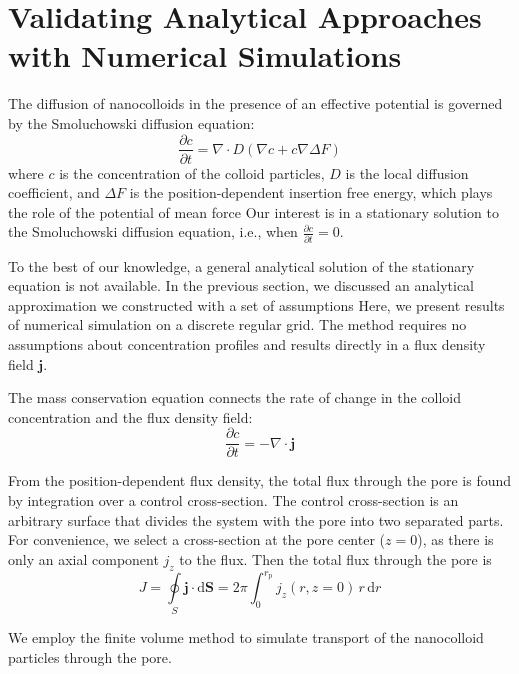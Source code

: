 \documentclass[10pt, a4paper]{article}
\begin{document}
\section{Validating Analytical Approaches with Numerical Simulations}

\begin{multicols}{2}
The diffusion of nanocolloids in the presence of an effective potential is governed by the Smoluchowski diffusion equation:
\begin{equation}
    \label{eq:Smoluchowski}
    \frac{\partial c}{\partial t} = \nabla \cdot D(\nabla c + c \nabla \Delta F)
\end{equation}
where $c$ is the concentration of the colloid particles, $D$ is the local diffusion coefficient, and $\Delta F$ is the position-dependent insertion free energy, which plays the role of the potential of mean force
Our interest is in a stationary solution to the Smoluchowski diffusion equation, i.e., when $\frac{\partial c}{\partial t} = 0$.

To the best of our knowledge, a general analytical solution of the stationary equation is not available.
In the previous section, we discussed an analytical approximation we constructed with a set of assumptions
Here, we present results of numerical simulation on a discrete regular grid.
The method requires no assumptions about concentration profiles and results directly in a flux density field $\bm{j}$.

The mass conservation equation connects the rate of change in the colloid concentration and the flux density field:
\begin{equation}
    \frac{\partial c}{\partial t} = -\nabla \cdot \bm{j}
\end{equation}

From the position-dependent flux density, the total flux through the pore is found by integration over a control cross-section.
The control cross-section is an arbitrary surface that divides the system with the pore into two separated parts.
For convenience, we select a cross-section at the pore center ($z = 0$), as there is only an axial component $j_z$ to the flux.
Then the total flux through the pore is
\begin{equation}
    \label{eq:total_flux_1}
    J = \oint\limits_{S} \bm{j} \cdot \text{d}\bm{S} = 2 \pi \int_0^{r_{\text{p}}} j_z(r, z = 0) \, r \, \text{d}r
\end{equation}

We employ the finite volume method to simulate transport of the nanocolloid particles through the pore.


\end{multicols}
\end{document}
